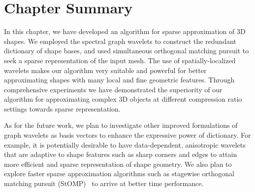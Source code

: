 \section{Chapter Summary}

In this chapter, we have developed an algorithm for sparse
approximation of 3D shapes. We employed the spectral graph wavelets to
construct the redundant dictionary of shape bases, and used
simultaneous orthogonal matching pursuit to seek a sparse
representation of the input mesh. The use of spatially-localized
wavelets makes our algorithm very suitable and powerful for better
approximating shapes with many local and fine geometric features.
Through comprehensive experiments we have demonstrated the superiority
of our algorithm for approximating complex 3D objects at different
compression ratio settings towards sparse representation.

As for the future work, we plan to investigate other
improved formulations of graph wavelets as basis vectors to enhance
the expressive power of dictionary. For example, it is potentially desirable
to have data-dependent, anisotropic wavelets that are adaptive to shape
features such as sharp corners and edges to attain more efficient and 
sparse representation of shape geometry. We also
plan to explore faster sparse approximation algorithms such as
stagewise orthogonal matching pursuit (StOMP)~\cite{Donoho2012} to
arrive at better time performance. 